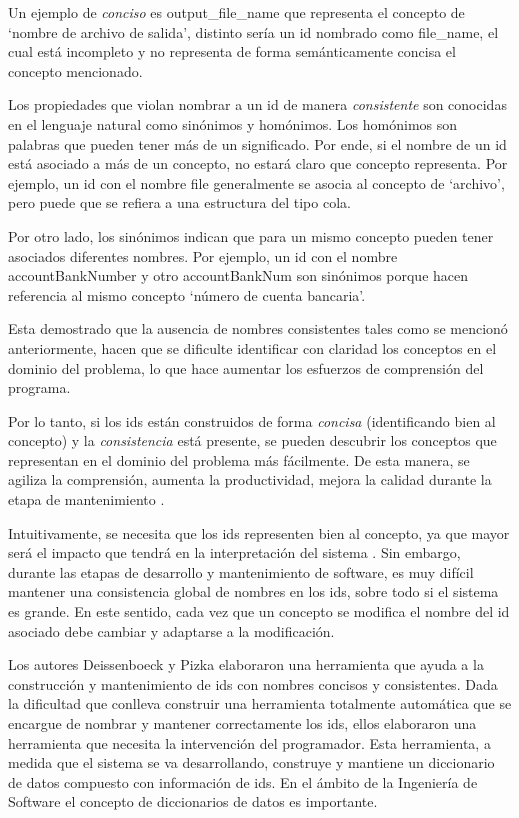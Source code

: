 Un ejemplo de \textit{conciso} es \textsf{output\_file\_name} que representa el concepto de `nombre de archivo de salida', distinto sería un id nombrado como \textsf{file\_name}, el cual está incompleto y no representa de forma semánticamente concisa el concepto mencionado.

Los propiedades que violan nombrar a un id de manera \textit{consistente} son conocidas en el lenguaje natural como sinónimos y homónimos. 
Los homónimos son palabras que pueden tener más de un significado. Por ende, si el nombre de un id está asociado a más de un concepto, no estará claro que concepto representa. Por ejemplo, un id con el nombre \textsf{file} generalmente se asocia al concepto de `archivo', pero puede que se refiera a una estructura del tipo cola.

Por otro lado, los sinónimos indican que para un mismo concepto pueden tener asociados diferentes nombres. Por ejemplo, un id con el nombre \mbox{\textsf{accountBankNumber}} y otro \textsf{accountBankNum} son sinónimos porque hacen referencia al mismo concepto `número de cuenta bancaria'. 

Esta demostrado \cite{DFPM05,DLHD06,NIATL98,DMDJ13} que la ausencia de nombres consistentes tales como se mencionó anteriormente, hacen que se dificulte identificar con claridad los conceptos en el dominio del problema, lo que hace aumentar los esfuerzos de comprensión del programa. 


Por lo tanto, si los ids están construidos de forma \textit{concisa} (identificando bien al concepto) y la \textit{consistencia} está presente, se pueden descubrir los conceptos que representan en el dominio del problema más fácilmente. De esta manera, se agiliza la comprensión, aumenta la productividad, mejora la calidad durante la etapa de mantenimiento \cite{DFPM05,DLHD06}.%

Intuitivamente, se necesita que los ids representen bien al concepto, ya que mayor será el impacto que tendrá en la interpretación del sistema \cite{DFPM05,DLHD06,SBWYY10}. Sin embargo, durante las etapas de desarrollo y mantenimiento de software, es muy difícil mantener una consistencia global de nombres en los ids, sobre todo si el sistema es grande. En este sentido, cada vez que un concepto se modifica el nombre del id asociado debe cambiar y adaptarse a la modificación.

Los autores Deissenboeck y Pizka \cite{DFPM05} elaboraron una herramienta que ayuda a la construcción y mantenimiento de ids con nombres concisos y consistentes. Dada la dificultad que conlleva construir una herramienta totalmente automática que se encargue de nombrar y mantener correctamente los ids, ellos elaboraron una herramienta que necesita la intervención del programador. Esta herramienta, a medida que el sistema se va desarrollando, construye y mantiene un diccionario de datos compuesto con información de ids. En el ámbito de la Ingeniería de Software el concepto de diccionarios de datos es importante.


